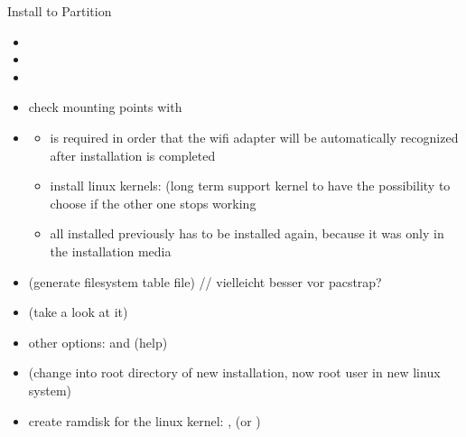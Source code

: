 \begin{frame}{Install to Partition\vspace{0.5cm}}
  \begin{itemize}
    \item {}
    \item {}
    \item {}
    \item check mounting points with 
    \item {}
      \begin{Sidenote}
        \begin{itemize}
          \scriptsize
          \item {} is required in order that the  wifi adapter will be automatically recognized after installation is completed
          \item install linux kernels:  (long term support kernel to have the possibility to choose if the other one stops working
          \item all installed previously has to be installed again, because it was only in the installation media
        \end{itemize}
      \end{Sidenote}
    \item {} (generate filesystem table file) // vielleicht besser vor pacstrap?
    \item {} (take a look at it)
      \item other options:  and  (help)
      \item {} (change into root directory of new installation, now root user in new linux system)
  \end{itemize}
  \begin{Sidenote}
    \begin{itemize}
      \scriptsize
      \item create ramdisk for the linux kernel: ,  (or )
    \end{itemize}
  \end{Sidenote}
\end{frame}

